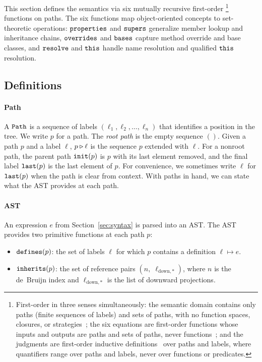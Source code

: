 This section defines the semantics via six mutually recursive
first-order%
\footnote{
  First-order in three senses simultaneously:
  the semantic domain contains only paths (finite
  sequences of labels) and sets of paths, with no function
  spaces, closures, or strategies~\cite{vanemden1976-predicate-logic-semantics};
  the six equations are first-order functions whose
  inputs and outputs are paths and sets of paths,
  never functions~\cite{reynolds1972-definitional-interpreters};
  and the judgments are first-order inductive
  definitions~\cite{aczel1977-inductive-definitions} over paths
  and labels, where quantifiers range over paths and labels,
  never over functions or predicates.
}
functions on paths.
The six functions map object-oriented concepts to
set-theoretic operations: $\mathtt{properties}$ and $\mathtt{supers}$
generalize member lookup and inheritance chains,
$\mathtt{overrides}$ and $\mathtt{bases}$ capture method override and
base classes, and $\mathtt{resolve}$ and $\mathtt{this}$ handle name
resolution and qualified $\mathtt{this}$ resolution.

\subsection{Definitions}

\paragraph{Path}
A $\mathtt{Path}$ is a sequence of labels
$(\ell_1, \ell_2, \ldots, \ell_n)$ that identifies a position in
the tree.
We write $p$ for a path.
The \emph{root path} is the empty sequence $()$.
Given a path $p$ and a label $\ell$,
$p \mathbin{\triangleright} \ell$ is the sequence $p$ extended with $\ell$.
For a nonroot path, the parent path $\mathtt{init}(p)$ is $p$ with
its last element removed,
and the final label $\mathtt{last}(p)$ is the last element of $p$.
For convenience, we sometimes write $\ell$ for $\mathtt{last}(p)$
when the path is clear from context.
With paths in hand, we can state what the AST provides
at each path.

\paragraph{AST}
An expression $e$ from Section~\ref{sec:syntax} is parsed into an AST.
The AST provides two primitive functions at each path $p$:
\begin{itemize}
  \item $\mathtt{defines}(p)$: the set of labels $\ell$ for which $p$
    contains a definition $\ell \mapsto e$.
  \item $\mathtt{inherits}(p)$: the set of reference pairs
    $(n,\; \ell_{\mathrm{down},*})$,
    where $n$ is the de~Bruijn index
    and $\ell_{\mathrm{down},*}$ is the list of downward projections.
\end{itemize}


